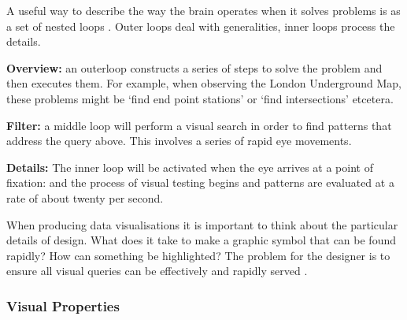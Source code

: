 \documentclass[a4paper,11pt,titlepage]{article}
\begin{document}
		A useful way to describe the way the brain operates when it solves problems is as a set of nested loops \cite{Ware2010}. Outer loops deal with generalities, inner loops process the details. 
		\par 
		\textbf{Overview:} an outerloop constructs a series of steps to solve the problem and then executes them. For example, when observing the London Underground Map, these problems might be `find end point stations' or `find intersections' etcetera.
		\par 
		\textbf{Filter:} a middle loop will perform a visual search in order to find patterns that address the query above. This involves a series of rapid eye movements. 
		\par 
		\textbf{Details:} The inner loop will be activated when the eye arrives at a point of fixation: and the process of visual testing begins and patterns are evaluated at a rate of about twenty per second. 
		\par 
		When producing data visualisations it is important to think about the particular details of design. What does it take to make a graphic symbol that can be found rapidly? How can something be highlighted? The problem for the designer is to ensure all visual queries can be effectively and rapidly served \cite{Keim2002}. 

		\subsubsection{Visual Properties}
  		 
\end{document}
